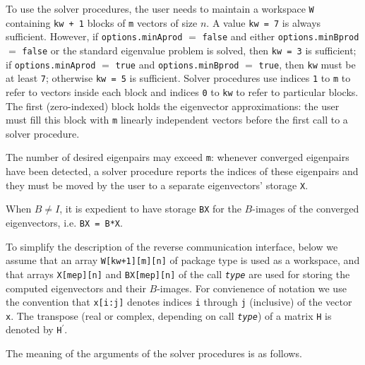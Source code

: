 \medskip
To use the solver procedures,
the user needs to maintain a workspace {\tt W} containing
{\tt kw + 1} blocks of {\tt m} vectors of size $n$.
A value {\tt kw = 7} is always sufficient. 
However, if {\tt options.minAprod} $=$ {\tt false}
and either {\tt options.minBprod} $=$ {\tt false} or 
the standard eigenvalue problem  is solved,
then {\tt kw = 3} is sufficient; 
if 
{\tt options.minAprod} $=$ {\tt true} and
{\tt options.minBprod} $=$ {\tt true},
then {\tt kw} must be at least {\tt 7};
otherwise {\tt kw = 5} is sufficient.
Solver procedures
use indices {\tt 1} to {\tt m} 
to refer to vectors inside each block
and indices {\tt 0} to {\tt kw} 
to refer to particular blocks.
The first (zero-indexed) block holds the eigenvector approximations:
the user must fill this block with 
{\tt m} linearly independent vectors before the first call
to a solver procedure.

The number of desired eigenpairs may exceed {\tt m}:
whenever converged eigenpairs have been detected,
a solver procedure reports the indices of these eigenpairs
and they must be moved by the user
to a separate eigenvectors' storage {\tt X}.

When $B \ne I$,
it is expedient to 
have %
storage {\tt BX}
for the $B$-images of the converged eigenvectors,
i.e. {\tt BX = B*X}.

To simplify the description of the
reverse communication interface,
below we assume that an array
{\tt W[kw+1][m][n]} of package type
is used as a workspace,
and that arrays {\tt X[mep][n]} and {\tt BX[mep][n]} of the call
\texttt{\textit{type}}
are used for storing the computed eigenvectors
and their $B$-images.
For convienence of notation we use the convention that \texttt{x[i:j]}
denotes indices {\tt i} through {\tt j} (inclusive) of the vector {\tt x}.
The transpose (real or complex, depending on call \texttt{\textit{type}})
of a matrix {\tt H} 
is denoted by {\tt H}$^\prime$.

\medskip
The meaning of the arguments of the solver procedures is as follows.

